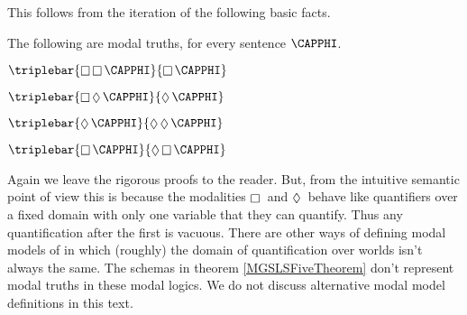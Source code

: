 This follows from the iteration of the following basic facts.
\begin{majorILnc}{} The following are modal truths, for every sentence $\CAPPHI$.
\begin{multicols}{2}
\begin{cenumerate}
\item $\triplebar{\BOX\BOX\CAPPHI}{\BOX\CAPPHI}$
\item $\triplebar{\BOX\DIAMOND\CAPPHI}{\DIAMOND\CAPPHI}$
\item $\triplebar{\DIAMOND\CAPPHI}{\DIAMOND\DIAMOND\CAPPHI}$
\item $\triplebar{\BOX\CAPPHI}{\DIAMOND\BOX\CAPPHI}$
\end{cenumerate}
\end{multicols}
\end{majorILnc}
\noindent{}Again we leave the rigorous proofs to the reader.
But, from the intuitive semantic point of view this is because the modalities $\BOX$ and $\DIAMOND$ behave like quantifiers over a fixed domain with only one variable that they can quantify. 
Thus any quantification after the first is vacuous. 
There are other ways of defining modal models of in which (roughly) the domain of quantification over worlds isn't always the same. The schemas in theorem \ref{MGSLSFiveTheorem} don't represent modal truths in these modal logics. We do not discuss alternative modal model definitions in this text.

